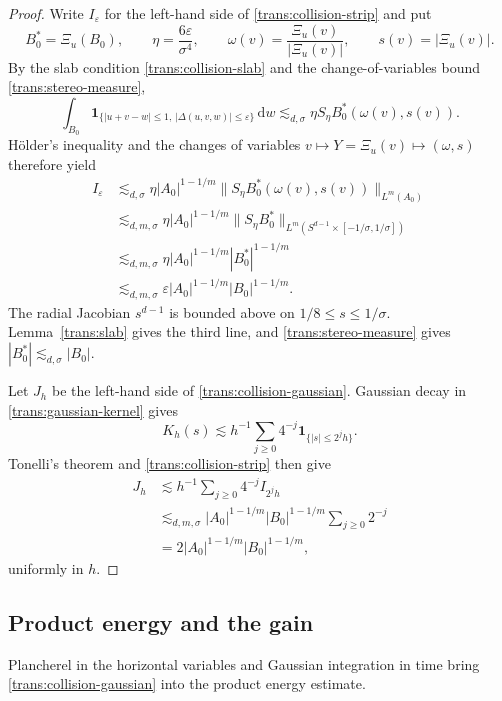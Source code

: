\documentclass[11pt]{article}
\numberwithin{equation}{section}
\newcommand{\dd}{\,\mathrm{d}}
\newcommand{\norm}[1]{\lVert #1\rVert}
\begin{document}
\begin{proof}
Write \(I_\varepsilon\) for the left-hand side of \eqref{trans:collision-strip} and put
\[
 B_0^*=\Xi_u(B_0),\qquad \eta=\frac{6\varepsilon}{\sigma^4},\qquad
 \omega(v)=\frac{\Xi_u(v)}{|\Xi_u(v)|},\qquad s(v)=|\Xi_u(v)|.
\]
By the slab condition \eqref{trans:collision-slab} and the change-of-variables bound \eqref{trans:stereo-measure},
\[
 \int_{B_0}
 \mathbf1_{\{|u+v-w|\leq1,\,|\Delta(u,v,w)|\leq\varepsilon\}}\dd w
 \lesssim_{d,\sigma}\eta S_\eta B_0^*(\omega(v),s(v)).
\]
H\"older's inequality and the changes of variables
\(v\mapsto Y=\Xi_u(v)\mapsto(\omega,s)\) therefore yield
\begin{align*}
 I_\varepsilon
 &\lesssim_{d,\sigma}\eta |A_0|^{1-1/m}
       \norm{S_\eta B_0^*(\omega(v),s(v))}_{L^m(A_0)}\\
 &\lesssim_{d,m,\sigma}\eta |A_0|^{1-1/m}
       \norm{S_\eta B_0^*}_{L^m(S^{d-1}\times[-1/\sigma,1/\sigma])}\\
 &\lesssim_{d,m,\sigma}\eta
       |A_0|^{1-1/m}|B_0^*|^{1-1/m}\\
 &\lesssim_{d,m,\sigma}\varepsilon
       |A_0|^{1-1/m}|B_0|^{1-1/m}.
\end{align*}
The radial Jacobian \(s^{d-1}\) is bounded above on
\(1/8\leq s\leq1/\sigma\). Lemma~\ref{trans:slab} gives the third
line, and \eqref{trans:stereo-measure} gives
\(|B_0^*|\lesssim_{d,\sigma}|B_0|\).

Let \(J_h\) be the left-hand side of \eqref{trans:collision-gaussian}. Gaussian decay in \eqref{trans:gaussian-kernel} gives
\[
 K_h(s)\lesssim h^{-1}\sum_{j\geq0}4^{-j}
               \mathbf1_{\{|s|\leq2^j h\}}.
\]
Tonelli's theorem and \eqref{trans:collision-strip} then give
\begin{align*}
 J_h
 &\lesssim h^{-1}\sum_{j\geq0}4^{-j}I_{2^jh}\\
 &\lesssim_{d,m,\sigma}
    |A_0|^{1-1/m}|B_0|^{1-1/m}\sum_{j\geq0}2^{-j}\\
 &=2|A_0|^{1-1/m}|B_0|^{1-1/m},
\end{align*}
uniformly in \(h\).
\end{proof}

\subsection{Product energy and the gain}

Plancherel in the horizontal variables and Gaussian integration in
time bring \eqref{trans:collision-gaussian} into the product energy
estimate.
\end{document}
